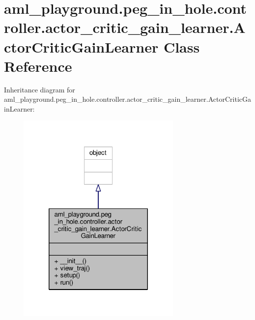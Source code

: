 \hypertarget{classaml__playground_1_1peg__in__hole_1_1controller_1_1actor__critic__gain__learner_1_1_actor_critic_gain_learner}{\section{aml\-\_\-playground.\-peg\-\_\-in\-\_\-hole.\-controller.\-actor\-\_\-critic\-\_\-gain\-\_\-learner.\-Actor\-Critic\-Gain\-Learner Class Reference}
\label{classaml__playground_1_1peg__in__hole_1_1controller_1_1actor__critic__gain__learner_1_1_actor_critic_gain_learner}
}


Inheritance diagram for aml\-\_\-playground.\-peg\-\_\-in\-\_\-hole.\-controller.\-actor\-\_\-critic\-\_\-gain\-\_\-learner.\-Actor\-Critic\-Gain\-Learner\-:
\nopagebreak
\begin{figure}[H]
\begin{center}
\leavevmode
\includegraphics[width=228pt]{classaml__playground_1_1peg__in__hole_1_1controller_1_1actor__critic__gain__learner_1_1_actor_cr8188a45f10ee93c4fd80a5e9b2b3aed4}
\end{center}
\end{figure}


